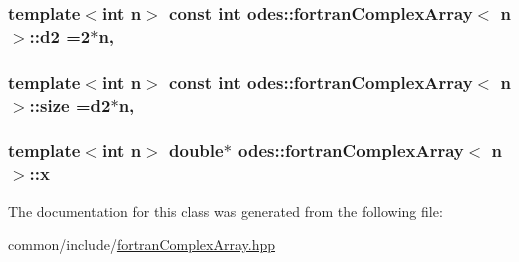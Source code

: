 \subsubsection[{d2}]{\setlength{\rightskip}{0pt plus 5cm}template$<$int n$>$ const int {\bf odes\+::fortran\+Complex\+Array}$<$ n $>$\+::d2 =2$\ast$n\hspace{0.3cm}{\ttfamily [static]}, {\ttfamily [private]}}\label{classodes_1_1fortranComplexArray_a4a79c76e0201e3a23c69a140d42da344}
\hypertarget{classodes_1_1fortranComplexArray_ac159f829fcb5c32cfbc78546d39452d0}{}
\subsubsection[{size}]{\setlength{\rightskip}{0pt plus 5cm}template$<$int n$>$ const int {\bf odes\+::fortran\+Complex\+Array}$<$ n $>$\+::size ={\bf d2}$\ast$n\hspace{0.3cm}{\ttfamily [static]}, {\ttfamily [private]}}\label{classodes_1_1fortranComplexArray_ac159f829fcb5c32cfbc78546d39452d0}
\hypertarget{classodes_1_1fortranComplexArray_a4b71df9aca87088e6481bda169307b1e}{}
\subsubsection[{x}]{\setlength{\rightskip}{0pt plus 5cm}template$<$int n$>$ double$\ast$ {\bf odes\+::fortran\+Complex\+Array}$<$ n $>$\+::x\hspace{0.3cm}{\ttfamily [private]}}\label{classodes_1_1fortranComplexArray_a4b71df9aca87088e6481bda169307b1e}


The documentation for this class was generated from the following file\+:\begin{DoxyCompactItemize}
\item 
common/include/\hyperlink{fortranComplexArray_8hpp}{fortran\+Complex\+Array.\+hpp}\end{DoxyCompactItemize}
